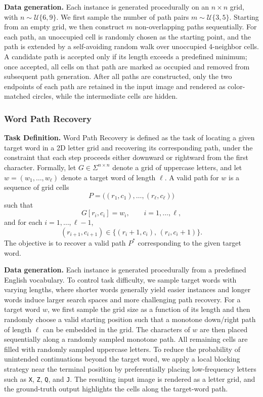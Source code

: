 \textbf{Data generation.} Each instance is generated procedurally on an \(n \times n\) grid, with
\(n \sim \mathcal{U}\{6,9\}\). We first sample the number of path pairs
\(m \sim \mathcal{U}\{3,5\}\). Starting from an empty grid, we then construct
\(m\) non-overlapping paths sequentially. For each path, an unoccupied cell is
randomly chosen as the starting point, and the path is extended by a
self-avoiding random walk over unoccupied 4-neighbor cells. A candidate path
is accepted only if its length exceeds a predefined minimum; once accepted, all
cells on that path are marked as occupied and removed from subsequent path
generation. After all paths are constructed, only the two endpoints of each path are
retained in the input image and rendered as color-matched circles, while the
intermediate cells are hidden. 

\subsubsection{Word Path Recovery}
\textbf{Task Definition.}
Word Path Recovery is defined as the task of locating a given
target word in a 2D letter grid and recovering its corresponding path, under
the constraint that each step proceeds either downward or rightward from the
first character. Formally, let \(G \in \Sigma^{n \times n}\) denote a grid of uppercase letters,
and let \(w = (w_1, \dots, w_\ell)\) denote a target word of length \(\ell\).
A valid path for \(w\) is a sequence of grid cells
\[
P = \bigl((r_1,c_1), \dots, (r_\ell,c_\ell)\bigr)
\]
such that
\[
G[r_i,c_i] = w_i, \qquad i=1,\dots,\ell,
\]
and for each \(i=1,\dots,\ell-1\),
\[
(r_{i+1},c_{i+1}) \in \{(r_i+1,c_i),\, (r_i,c_i+1)\}.
\]
The objective is to recover a valid path \(P^*\) corresponding to the given
target word.


\textbf{Data generation.}
Each instance is generated procedurally from a predefined English vocabulary.
To control task difficulty, we sample target words with varying lengths, where
shorter words generally yield easier instances and longer words induce larger
search spaces and more challenging path recovery. For a target word \(w\), we
first sample the grid size as a function of its length and then randomly choose
a valid starting position such that a monotone down/right path of length
\(\ell\) can be embedded in the grid. The characters of \(w\) are then placed
sequentially along a randomly sampled monotone path.
All remaining cells are filled with randomly sampled uppercase letters. To
reduce the probability of unintended continuations beyond the target word, we
apply a local blocking strategy near the terminal position by preferentially
placing low-frequency letters such as \texttt{X}, \texttt{Z}, \texttt{Q}, and
\texttt{J}. The resulting input image is rendered as a letter grid, and the
ground-truth output highlights the cells along the target-word path.

